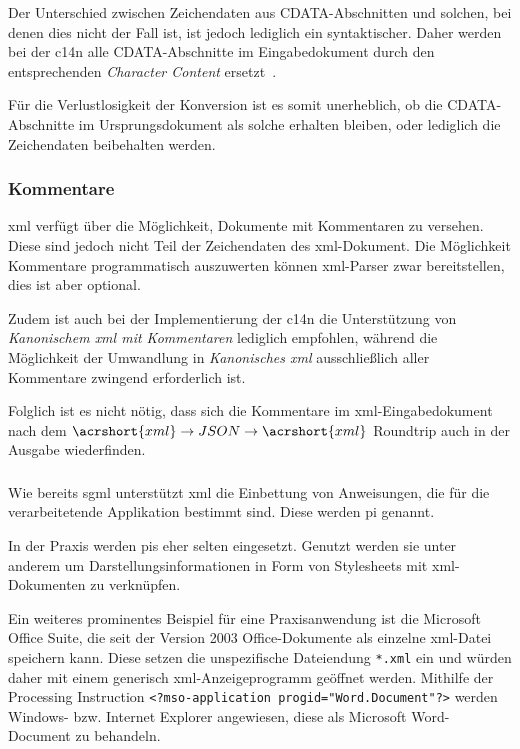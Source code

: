 Der Unterschied zwischen Zeichendaten aus CDATA-Abschnitten und solchen, bei denen dies nicht der Fall ist, ist jedoch lediglich ein syntaktischer. Daher werden bei der \acrlong{c14n} alle CDATA-Abschnitte im Eingabedokument durch den entsprechenden \emph{Character Content} ersetzt~\cite[Abschnitt~2.1]{boyer2001c14n}.

Für die Verlustlosigkeit der Konversion ist es somit unerheblich, ob die CDATA-Abschnitte im Ursprungsdokument als solche erhalten bleiben, oder lediglich die Zeichendaten beibehalten werden.

\subsubsection{Kommentare}

\acrshort{xml} verfügt über die Möglichkeit, Dokumente mit Kommentaren zu versehen. Diese sind jedoch nicht Teil der Zeichendaten des \acrshort{xml}-Dokument. Die Möglichkeit Kommentare programmatisch auszuwerten können  \acrshort{xml}-Parser zwar bereitstellen, dies ist aber optional.

Zudem ist auch bei der Implementierung der \acrlong{c14n} die Unterstützung von \emph{Kanonischem \acrshort{xml} mit Kommentaren} lediglich empfohlen, während die Möglichkeit der Umwandlung in \emph{Kanonisches \acrshort{xml}} ausschließlich aller Kommentare zwingend erforderlich ist.~\cite[Abschnitt~2.1]{boyer2001c14n}

Folglich ist es nicht nötig, dass sich die Kommentare im \acrshort{xml}-Eingabedokument nach dem $\acrshort{xml}\rightarrow{}JSON\rightarrow{}\acrshort{xml}$ Roundtrip auch in der Ausgabe wiederfinden.

\subsubsection{}

Wie bereits \acrshort{sgml} unterstützt \acrshort{xml} die Einbettung von Anweisungen, die für die verarbeitetende Applikation bestimmt sind. Diese werden \acrfull{pi} genannt. 

In der Praxis werden \glspl{pi} eher selten eingesetzt. Genutzt werden sie unter anderem um Darstellungsinformationen in Form von Stylesheets mit \acrshort{xml}-Dokumenten zu verknüpfen.~\cite[Abschnitt 4]{xmlstylesheet}

Ein weiteres prominentes Beispiel für eine Praxisanwendung ist die Microsoft Office Suite, die seit der Version 2003 Office-Dokumente als einzelne \acrshort{xml}-Datei speichern kann. Diese setzen die unspezifische Dateiendung \texttt{*.xml} ein und würden daher mit einem generisch \acrshort{xml}-Anzeigeprogramm geöffnet werden. Mithilfe der Processing Instruction \texttt{<?mso-application progid="Word.Document"?>} werden Windows- bzw. Internet Explorer angewiesen, diese als Microsoft Word-Document zu behandeln.~\cite[Abschnitt 3.2]{tverskov2008understandingpi}

